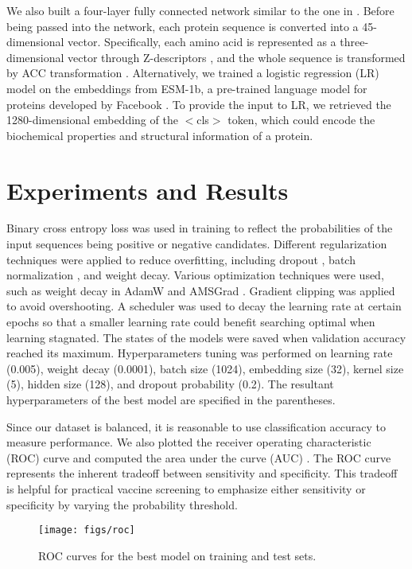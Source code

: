 \documentclass[conference]{IEEEtran}
\begin{document}
We also built a four-layer fully connected network similar to the one in \cite{Yang_2021}. Before being passed into the network, each protein sequence is converted into a 45-dimensional vector. Specifically, each amino acid is represented as a three-dimensional vector through Z-descriptors \cite{Hellberg_1987}, and the whole sequence is transformed by ACC transformation \cite{Wold_1993}. Alternatively, we trained a logistic regression (LR) model on the embeddings from ESM-1b, a pre-trained language model for proteins developed by Facebook \cite{Rives_2021}. To provide the input to LR, we retrieved the 1280-dimensional embedding of the $<$cls$>$ token, which could encode the biochemical properties and structural information of a protein.

\section{Experiments and Results}
Binary cross entropy loss was used in training to reflect the probabilities of the input sequences being positive or negative candidates. Different regularization techniques were applied to reduce overfitting, including dropout \cite{srivastava2014dropout}, batch normalization \cite{ioffe2015batch}, and weight decay. Various optimization techniques were used, such as weight decay in AdamW \cite{loshchilov2017decoupled} and AMSGrad \cite{reddi2019convergence}. Gradient clipping was applied to avoid overshooting. A scheduler was used to decay the learning rate at certain epochs so that a smaller learning rate could benefit searching optimal when learning stagnated. The states of the models were saved when validation accuracy reached its maximum. Hyperparameters tuning was performed on learning rate (0.005), weight decay (0.0001), batch size (1024), embedding size (32), kernel size (5), hidden size (128), and dropout probability (0.2). The resultant hyperparameters of the best model are specified in the parentheses.

Since our dataset is balanced, it is reasonable to use classification accuracy to measure performance. We also plotted the receiver operating characteristic (ROC) curve and computed the area under the curve (AUC) \cite{Fawcett_2006}. The ROC curve represents the inherent tradeoff between sensitivity and specificity. This tradeoff is helpful for practical vaccine screening to emphasize either sensitivity or specificity by varying the probability threshold.

\begin{figure}
\begin{center}
\texttt{[image: figs/roc]}
\end{center}
\caption{ROC curves for the best model on training and test sets.}
\label{fig2}
\end{figure}
\end{document}
